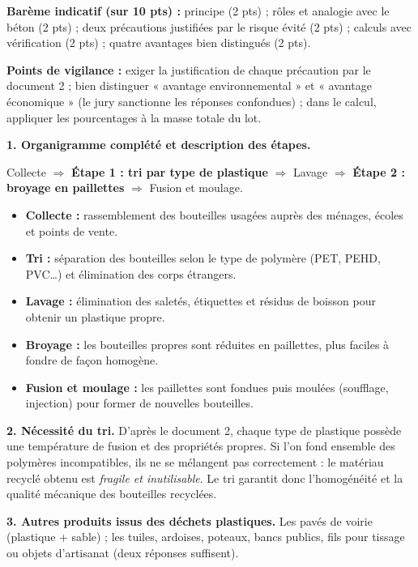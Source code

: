 \documentclass[11pt]{article}
\newcommand{\cle}[1]{{\popxbold\color{popdark}#1}}
\begin{document}
\begin{corrige}
\textbf{Barème indicatif (sur 10 pts) :} principe (2 pts) ; rôles et analogie avec le béton (2 pts) ; deux précautions justifiées par le risque évité (2 pts) ; calculs avec vérification (2 pts) ; quatre avantages bien distingués (2 pts).

\textbf{Points de vigilance :} exiger la justification de chaque précaution par le document 2 ; bien distinguer « avantage environnemental » et « avantage économique » (le jury sanctionne les réponses confondues) ; dans le calcul, appliquer les pourcentages à la masse totale du lot.
\end{corrige}

\begin{corrige}
\textbf{1. Organigramme complété et description des étapes.}
\begin{center}
Collecte $\Rightarrow$ \textbf{Étape 1 : tri par type de plastique} $\Rightarrow$ Lavage $\Rightarrow$ \textbf{Étape 2 : broyage en paillettes} $\Rightarrow$ Fusion et moulage.
\end{center}
\begin{itemize}
\item \textbf{Collecte :} rassemblement des bouteilles usagées auprès des ménages, écoles et points de vente.
\item \textbf{Tri :} séparation des bouteilles selon le type de polymère (PET, PEHD, PVC\ldots) et élimination des corps étrangers.
\item \textbf{Lavage :} élimination des saletés, étiquettes et résidus de boisson pour obtenir un plastique propre.
\item \textbf{Broyage :} les bouteilles propres sont réduites en paillettes, plus faciles à fondre de façon homogène.
\item \textbf{Fusion et moulage :} les paillettes sont fondues puis moulées (soufflage, injection) pour former de nouvelles bouteilles.
\end{itemize}

\textbf{2. Nécessité du tri.} D'après le document 2, chaque type de plastique possède une température de fusion et des propriétés propres. Si l'on fond ensemble des polymères incompatibles, ils ne se mélangent pas correctement : le matériau recyclé obtenu est \emph{fragile et inutilisable}. Le tri garantit donc l'homogénéité et la qualité mécanique des bouteilles recyclées.

\textbf{3. Autres produits issus des déchets plastiques.} Les \cle{pavés} de voirie (plastique + sable) ; les \cle{tuiles}, ardoises, poteaux, bancs publics, fils pour tissage ou objets d'artisanat (deux réponses suffisent).


\end{corrige}
\end{document}
